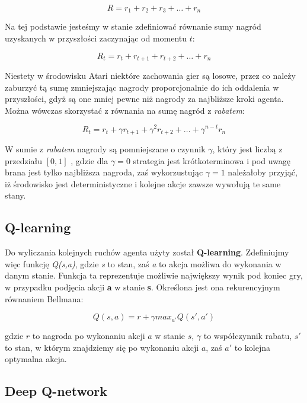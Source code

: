 \documentclass[12pt]{article}
\begin{document}
$$R=r_1 + r_2 + r_3 + \dots + r_n$$

Na tej podstawie jesteśmy w stanie zdefiniować równanie sumy nagród uzyskanych w przyszłości zaczynając od momentu $t$:

$$R_t=r_t + r_{t+1}+ r_{t+2} + \dots + r_n$$

Niestety w środowisku Atari niektóre zachowania gier są losowe, przez co należy zaburzyć tą sumę zmniejszając nagrody proporcjonalnie do ich oddalenia w przyszłości, gdyż są one mniej pewne niż nagrody za najbliższe kroki agenta. Można wówczas skorzystać z równania na sumę nagród z \textit{rabatem}:

$$R_t=r_t + \gamma r_{t+1}+  \gamma^2 r_{t+2} + \dots + \gamma^{n-t}r_n$$

W sumie z \textit{rabatem} nagrody są pomniejszane o czynnik $\gamma$, który jest liczbą z przedziału $[0,1]$ , gdzie dla $\gamma =0$ strategia jest krótkoterminowa i pod uwagę brana jest tylko najbliższa nagroda, zaś wykorzustując $\gamma =1$ należałoby przyjąć, iż środowisko jest deterministyczne i kolejne akcje zawsze wywołują te same stany.

\subsection{Q-learning}

Do wyliczania kolejnych ruchów agenta użyty został \textbf{Q-learning}. Zdefiniujmy więc funkcję \textit{Q(s,a)}, gdzie \textit{s} to stan, zaś \textit{a} to akcja możliwa do wykonania w danym stanie. Funkcja ta reprezentuje możliwie największy wynik pod koniec gry, w przypadku podjęcia akcji \textbf{a} w stanie \textbf{s}. Określona jest ona rekurencyjnym równaniem Bellmana:

$$Q(s,a) =  r + \gamma max_{a'}Q(s',a')$$

gdzie $r$ to nagroda po wykonaniu akcji $a$ w stanie $s$, $\gamma$ to współczynnik rabatu, $s'$ to stan, w którym znajdziemy się po wykonaniu akcji $a$, zaś $a'$ to kolejna optymalna akcja.

\subsection{Deep Q-network}
\end{document}
